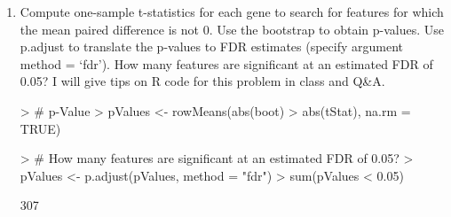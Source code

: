 \documentclass[12pt,a4paper]{paper}
\begin{document}
\begin{enumerate}
\begin{enumerate}
\item Compute one-sample t-statistics for each gene to search for features for which the mean
paired difference is not 0. Use the bootstrap to obtain p-values. Use p.adjust to translate
the p-values to FDR estimates (specify argument method = ‘fdr’). How many features
are significant at an estimated FDR of 0.05? I will give tips on R code for this problem
in class and Q\&A.
\begin{Schunk}
\end{Schunk}
\begin{Schunk}
\begin{Sinput}
> # p-Value
> pValues <- rowMeans(abs(boot) > abs(tStat), na.rm = TRUE)
\end{Sinput}
\end{Schunk}
\begin{Schunk}
\begin{Sinput}
> # How many features are significant at an estimated FDR of 0.05?
> pValues <- p.adjust(pValues, method = "fdr")
> sum(pValues < 0.05)
\end{Sinput}
\begin{Soutput}
[1] 307
\end{Soutput}
\end{Schunk}
\end{enumerate}
\end{enumerate}
\end{document}
